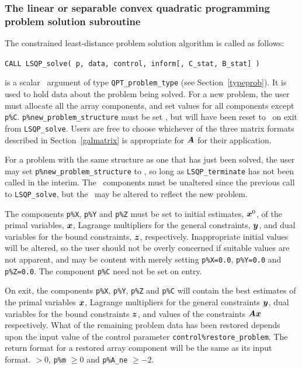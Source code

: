 \documentclass{galahad}
\newcommand{\packagename}{LSQP}
\begin{document}

\subsubsection{The linear or separable convex quadratic programming problem 
solution subroutine}
The  constrained least-distance problem solution algorithm is called as follows:
\vspace*{1mm}

\hspace{8mm}
{\tt CALL \packagename\_solve( p, data, control,  inform[, C\_stat, B\_stat] )}

\vspace*{-3mm}
\begin{description}
 is a scalar \intentinout\ argument of type 
{\tt QPT\_problem\_type}
(see Section~\ref{typeprob}). 
It is used to hold data about the problem being solved.
For a new problem, the user must allocate all the array components,
and set values for all components except {\tt p\%C}.
{\tt p\%new\_problem\_structure} must be set \true, but will have been reset
to \false\ on exit from {\tt \packagename\_solve}.
Users are free to choose whichever
of the three matrix formats described in Section~\ref{galmatrix} 
is appropriate for ${\bm{A}}$ for their application.

For a problem with the same structure as one that has just been 
solved, the user may set {\tt p\%new\_problem\_str\-u\-cture} to \false,
so long as {\tt \packagename\_terminate} has not been called in the interim.
The \integer\ components must be unaltered since the
previous call to {\tt \packagename\_solve}, but the \realdp\ 
may be altered to reflect the new problem.

The components {\tt p\%X}, {\tt p\%Y} and {\tt p\%Z}
must be set to initial estimates, ${\bm{x}}^{0}$, of the primal variables, 
${\bm{x}}$, Lagrange multipliers for the general constraints, ${\bm{y}}$, 
and dual variables for the bound constraints, ${\bm{z}}$, respectively.
Inappropriate initial values will be altered, so the user should
not be overly concerned if suitable values are not apparent, and may be
content with merely setting {\tt p\%X=0.0},
{\tt p\%Y=0.0} and {\tt p\%Z=0.0}.
The component {\tt p\%C} need not be set on entry.

On exit, the components {\tt p\%X}, {\tt p\%Y}, {\tt p\%Z} and {\tt p\%C}
will contain the best estimates of the primal variables ${\bm{x}}$, 
Lagrange multipliers for the general
constraints ${\bm{y}}$, dual variables for the bound constraints ${\bm{z}}$, 
and values of the constraints ${\bm{A}} {\bm{x}}$ respectively.
What of the remaining problem data has been restored depends upon
the input value of the control parameter {\tt control\%restore\_problem}.
The return format for a restored array component will be the same as its
input format.
 $> 0$, {\tt p\%m} $\geq 0$ and {\tt p\%A\_ne} 
              $\geq -2$.


\end{description}
\end{document}
